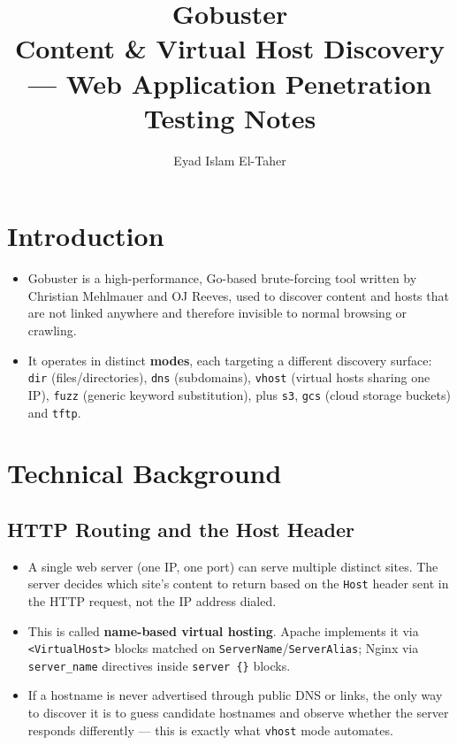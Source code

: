 \documentclass[11pt]{article}
\begin{document}
\title{\textbf{Gobuster}\\\large Content \& Virtual Host Discovery --- Web Application Penetration Testing Notes}
\author{Eyad Islam El-Taher}
\date{}
\maketitle
\tableofcontents
\newpage

\section{Introduction}

\begin{itemize}
    \item Gobuster is a high-performance, Go-based brute-forcing tool written by Christian Mehlmauer and OJ Reeves, used to discover content and hosts that are not linked anywhere and therefore invisible to normal browsing or crawling.
    \item It operates in distinct \textbf{modes}, each targeting a different discovery surface: \texttt{dir} (files/directories), \texttt{dns} (subdomains), \texttt{vhost} (virtual hosts sharing one IP), \texttt{fuzz} (generic keyword substitution), plus \texttt{s3}, \texttt{gcs} (cloud storage buckets) and \texttt{tftp}.
\end{itemize}

\section{Technical Background}

\subsection{HTTP Routing and the Host Header}
\begin{itemize}
    \item A single web server (one IP, one port) can serve multiple distinct sites. The server decides which site's content to return based on the \texttt{Host} header sent in the HTTP request, not the IP address dialed.
    \item This is called \textbf{name-based virtual hosting}. Apache implements it via \texttt{<VirtualHost>} blocks matched on \texttt{ServerName}/\texttt{ServerAlias}; Nginx via \texttt{server\_name} directives inside \texttt{server \{\}} blocks.
    \item If a hostname is never advertised through public DNS or links, the only way to discover it is to guess candidate hostnames and observe whether the server responds differently --- this is exactly what \texttt{vhost} mode automates.
\end{itemize}
\end{document}
